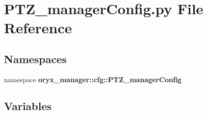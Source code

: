 \section{\-P\-T\-Z\-\_\-manager\-Config.\-py \-File \-Reference}
\label{PTZ__managerConfig_8py}
\subsection*{\-Namespaces}
\begin{DoxyCompactItemize}
\item 
namespace {\bf oryx\-\_\-manager\-::cfg\-::\-P\-T\-Z\-\_\-manager\-Config}
\end{DoxyCompactItemize}
\subsection*{\-Variables}
